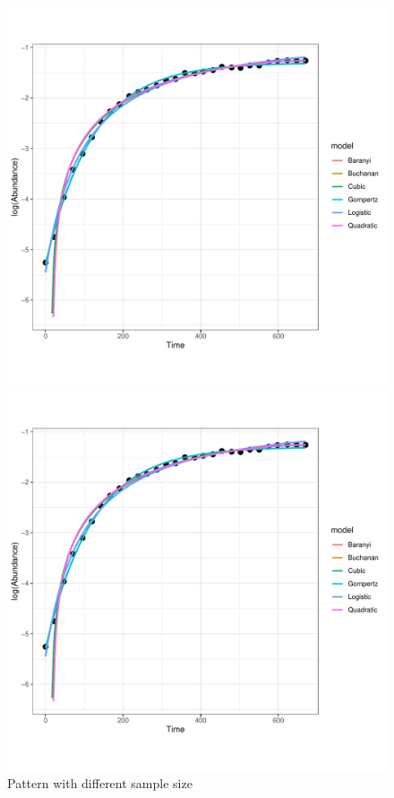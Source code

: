 \documentclass[11pt, oneside]{article}
\begin{document}
		\begin{figure}[H]
			\begin{center}
			\begin{minipage}{.5\textwidth}
				\centering
				\includegraphics[page=56, scale = 0.5]{plot_subsets.pdf}
			\end{minipage}%
			\begin{minipage}{.5\textwidth}
				\centering
				\includegraphics[page=285, scale = 0.5]{plot_subsets.pdf}
			\end{minipage}
			\end{center}
		\caption{Pattern with different sample size}
		\end{figure}
		
\end{document}
